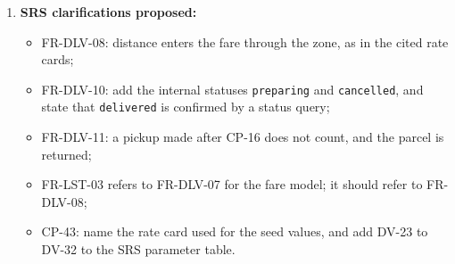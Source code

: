 \documentclass[11pt,a4paper]{article}
\begin{document}
\begin{enumerate}[label=\textbf{I-\arabic*}, leftmargin=*, nosep]
  \item \textbf{SRS clarifications proposed:}
  \begin{itemize}[nosep]
    \item FR-DLV-08: distance enters the fare through the zone, as in the cited rate cards;
    \item FR-DLV-10: add the internal statuses \texttt{preparing} and \texttt{cancelled}, and state that \texttt{delivered} is confirmed by a status query;
    \item FR-DLV-11: a pickup made after CP-16 does not count, and the parcel is returned;
    \item FR-LST-03 refers to FR-DLV-07 for the fare model; it should refer to FR-DLV-08;
    \item CP-43: name the rate card used for the seed values, and add DV-23 to DV-32 to the SRS parameter table.
  \end{itemize}
\end{enumerate}

\appendix
\end{document}
